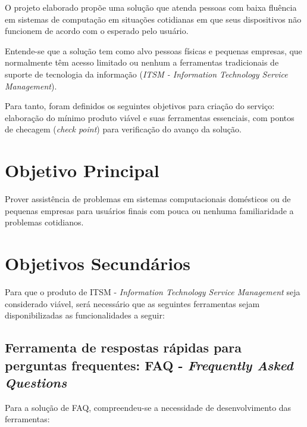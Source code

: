 \documentclass[
    12pt,               %
    openright,          %
    oneside,
    a4paper,            %
    MODELO,             %
    english,            %
    brazil              %
   ]{ifsp-spo-inf-ctds}
\begin{document}
O projeto elaborado propõe uma solução que atenda pessoas com baixa fluência em sistemas de computação em situações cotidianas em que seus dispositivos não funcionem de acordo com o esperado pelo usuário.

Entende-se que a solução tem como alvo pessoas físicas e pequenas empresas, que normalmente têm acesso limitado ou nenhum a ferramentas tradicionais de suporte de tecnologia da informação (\textit{ITSM - Information Technology Service Management}).

Para tanto, foram definidos os seguintes objetivos para criação do serviço: elaboração do mínimo produto viável e suas ferramentas essenciais, com pontos de checagem (\textit{check point}) para verificação do avanço da solução.

\section{Objetivo Principal}

Prover assistência de problemas em sistemas computacionais domésticos ou de pequenas empresas para usuários finais com pouca ou nenhuma familiaridade a problemas cotidianos.

\section{Objetivos Secundários}

Para que o produto de ITSM - \textit{Information Technology Service Management} seja considerado viável, será necessário que as seguintes ferramentas sejam disponibilizadas as funcionalidades a seguir: 

\subsection{Ferramenta de respostas rápidas para perguntas frequentes: FAQ - \textit{Frequently Asked Questions}}

	Para a solução de FAQ, compreendeu-se a necessidade de desenvolvimento das ferramentas:
	
\end{document}
